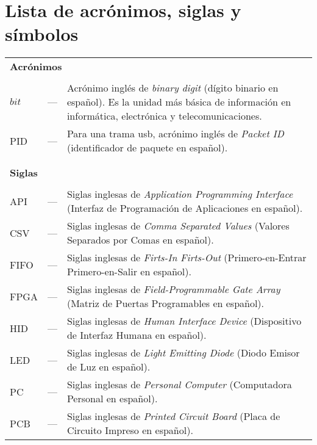 \chapter*{Lista de acrónimos, siglas y símbolos}
\label{LDS}

\begin{longtable}{lcp{} }

\multicolumn{3}{l}{\textbf{Acrónimos}}\\
\\
$bit$ & --- & Acrónimo inglés de \textit{binary digit} (dígito binario en español). Es la unidad más básica de información en informática, electrónica y telecomunicaciones.\\

PID & --- & Para una trama usb, acrónimo inglés de \textit{Packet ID} (identificador de paquete en español). \\

\\
\\

\multicolumn{3}{l}{\textbf{Siglas}}\\
\\
API & --- & Siglas inglesas de \textit{Application Programming Interface} (Interfaz de Programación de Aplicaciones en español).\\

CSV & --- & Siglas inglesas de \textit{Comma Separated Values} (Valores Separados por Comas en español).\\

FIFO & --- & Siglas inglesas de \textit{Firts-In Firts-Out} (Primero-en-Entrar Primero-en-Salir en español).\\

FPGA & --- & Siglas inglesas de \textit{Field-Programmable Gate Array} (Matriz de Puertas Programables en español).\\

HID & --- & Siglas inglesas de \textit{Human Interface Device} (Dispositivo de Interfaz Humana en español).\\

LED & --- & Siglas inglesas de \textit{Light Emitting Diode} (Diodo Emisor de Luz en español).\\

PC & --- & Siglas inglesas de \textit{Personal Computer} (Computadora Personal en español).\\

PCB & --- & Siglas inglesas de \textit{Printed Circuit Board} (Placa de Circuito Impreso en español).\\


\end{longtable}
